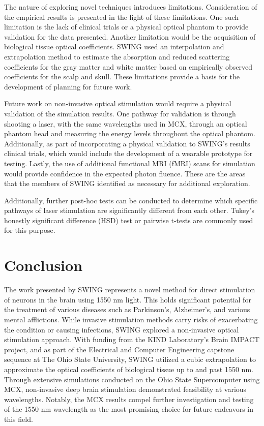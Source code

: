 \documentclass[journal,twoside,web]{ieeecolor}
\begin{document}
The nature of exploring novel techniques introduces limitations. Consideration of the empirical results is presented in the light of these limitations. One such
limitation is the lack of clinical trials or a physical optical phantom to provide validation for the data presented. Another limitation would be the acquisition
of biological tissue optical coefficients. SWING used an interpolation and extrapolation method to estimate the absorption and reduced scattering coefficients for
the gray matter and white matter based on empirically observed coefficients\cite{b5} for the scalp and skull. These limitations provide a basis for the
development of planning for future work. 

Future work on non-invasive optical stimulation would require a physical validation of the simulation results. 
One pathway for validation is through shooting a laser, with the same wavelengths used in MCX, through an optical phantom head and 
measuring the energy levels throughout the optical phantom. Additionally, as part of incorporating a physical validation to SWING's results
clinical trials, which would include the development of a wearable prototype for testing. Lastly, the use of additional functional MRI (fMRI) scans
for simulation would provide confidence in the expected photon fluence. These are the areas that the members of SWING identified as necessary for 
additional exploration.

Additionally, further post-hoc tests can be conducted to determine which specific pathways of laser stimulation are significantly different from each other. Tukey's honestly significant difference (HSD) test or pairwise t-tests are commonly used for this purpose.



\section{Conclusion}
\label{sec:conclusion}
The work presented by SWING represents a novel method for direct stimulation of neurons in the brain using 1550 nm light. This holds significant potential 
for the treatment of various diseases such as Parkinson's, Alzheimer's, and various mental afflictions. 
While invasive stimulation methods carry risks of exacerbating the condition or causing infections, SWING explored a non-invasive optical stimulation approach. 
With funding from the KIND Laboratory's Brain IMPACT project, and as part of the Electrical and Computer Engineering capstone sequence at The Ohio State University, 
SWING utilized a cubic extrapolation to approximate the optical coefficients of biological tissue up to and past 1550 nm. Through extensive simulations conducted on 
the Ohio State Supercomputer using MCX, non-invasive deep brain stimulation demonstrated feasibility at various wavelengths. Notably, 
the MCX results compel further investigation and testing of the 1550 nm wavelength as the most promising choice for future endeavors in this field. 
\end{document}
